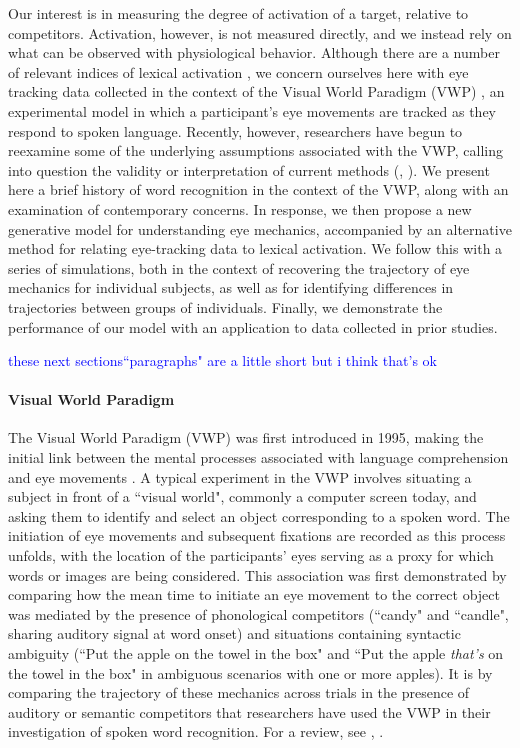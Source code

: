 \documentclass{article}
\providecommand{\cn}[1]{\textcolor{blue}{#1}}
\begin{document}
Our interest is in measuring the degree of activation of a target, relative to competitors. Activation, however, is not measured directly, and we instead rely on what can be observed with physiological behavior. Although there are a number of relevant indices of lexical activation \citep{Spivey2005}, we concern ourselves here with eye tracking data collected in the context of the Visual World Paradigm (VWP) \cite{tanenhaus1995integration}, an experimental model in which a participant's eye movements are tracked as they respond to spoken language. Recently, however, researchers have begun to reexamine some of the underlying assumptions associated with the VWP, calling into question the validity or interpretation of current methods (\cite{Magnuson2019}, \cite{mcmurray2022m}). We present here a brief history of word recognition in the context of the VWP, along with an examination of contemporary concerns. In response, we then propose a new generative model for understanding eye mechanics, accompanied by an alternative method for relating eye-tracking data to lexical activation. We follow this with a series of simulations, both in the context of recovering the trajectory of eye mechanics for individual subjects, as well as for identifying differences in trajectories between groups of individuals. Finally, we demonstrate the performance of our model with an application to data collected in prior studies. 


\cn{these next sections``paragraphs" are a little short but i think that's ok}

\paragraph{Visual World Paradigm} The Visual World Paradigm (VWP) was first introduced in 1995, making the initial link between the mental processes associated with language comprehension and eye movements \citep{tanenhaus1995integration}. A typical experiment in the VWP involves situating a subject in front of a ``visual world", commonly a computer screen today, and asking them to identify and select an object corresponding to a spoken word. The initiation of eye movements and subsequent fixations are recorded as this process unfolds, with the location of the participants' eyes serving as a proxy for which words or images are being considered. This association was first demonstrated by comparing how the mean time to initiate an eye movement to the correct object was mediated by the presence of phonological competitors (``candy" and ``candle", sharing auditory signal at word onset) and situations containing syntactic ambiguity (``Put the apple on the towel in the box" and ``Put the apple \textit{that's} on the towel in the box" in ambiguous scenarios with one or more apples). It is by comparing the trajectory of these mechanics across trials in the presence of auditory or semantic competitors that researchers have used the VWP in their investigation of spoken word recognition. For a review, see \citet{Huettig2011}, \citet{salverda2017visual}.
\end{document}
